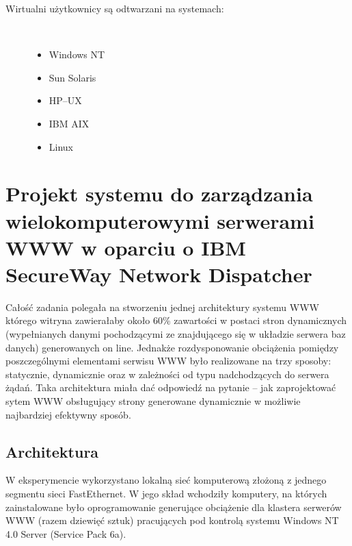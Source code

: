 \begin{description}
\item[Wirtualni użytkownicy są odtwarzani na systemach:]\
	\begin{itemize}
	\item Windows NT
	\item Sun Solaris
	\item HP--UX
	\item IBM AIX
	\item Linux
	\end{itemize}

\end{description}



\section{Projekt systemu do zarządzania wielokomputerowymi serwerami WWW w oparciu o IBM SecureWay Network Dispatcher}

Całość zadania polegała na stworzeniu jednej architektury systemu WWW którego witryna zawierałaby około 60\% zawartości
w postaci stron dynamicznych (wypełnianych danymi pochodzącymi ze znajdującego się w układzie serwera baz danych) generowanych
on line. Jednakże rozdysponowanie obciążenia pomiędzy poszczególnymi elementami serwisu WWW było realizowane na trzy sposoby: 
statycznie, dynamicznie oraz w zależności od typu nadchodzących do serwera żądań. Taka architektura miała dać odpowiedź na 
pytanie -- jak zaprojektować sytem WWW obsługujący strony generowane dynamicznie w możliwie najbardziej efektywny sposób.

\subsection{Architektura}

W eksperymencie wykorzystano lokalną sieć komputerową złożoną z jednego segmentu sieci FastEthernet. W jego skład wchodziły
komputery, na których zainstalowane było oprogramowanie generujące obciążenie dla klastera serwerów WWW (razem dziewięć sztuk)
pracujących pod kontrolą systemu Windows NT 4.0 Server (Service Pack 6a).
 
